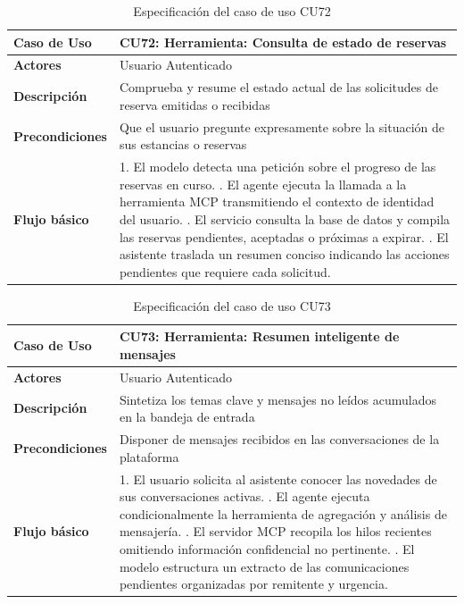 \begin{table}[H]
\centering
\begin{tabular}{|p{3.2cm}|p{11.3cm}|}
\hline
\textbf{Caso de Uso} & \textbf{CU72: Herramienta: Consulta de estado de reservas} \\ \hline
\textbf{Actores} & Usuario Autenticado \\ \hline
\textbf{Descripción} & Comprueba y resume el estado actual de las solicitudes de reserva emitidas o recibidas \\ \hline
\textbf{Precondiciones} & Que el usuario pregunte expresamente sobre la situación de sus estancias o reservas \\ \hline
\textbf{Flujo básico} & 
1. El modelo detecta una petición sobre el progreso de las reservas en curso. \newline
2. El agente ejecuta la llamada a la herramienta MCP transmitiendo el contexto de identidad del usuario. \newline
3. El servicio consulta la base de datos y compila las reservas pendientes, aceptadas o próximas a expirar. \newline
4. El asistente traslada un resumen conciso indicando las acciones pendientes que requiere cada solicitud. \\ \hline
\end{tabular}
\caption{Especificación del caso de uso CU72}
\label{tab:cu72}
\end{table}

\begin{table}[H]
\centering
\begin{tabular}{|p{3.2cm}|p{11.3cm}|}
\hline
\textbf{Caso de Uso} & \textbf{CU73: Herramienta: Resumen inteligente de mensajes} \\ \hline
\textbf{Actores} & Usuario Autenticado \\ \hline
\textbf{Descripción} & Sintetiza los temas clave y mensajes no leídos acumulados en la bandeja de entrada \\ \hline
\textbf{Precondiciones} & Disponer de mensajes recibidos en las conversaciones de la plataforma \\ \hline
\textbf{Flujo básico} & 
1. El usuario solicita al asistente conocer las novedades de sus conversaciones activas. \newline
2. El agente ejecuta condicionalmente la herramienta de agregación y análisis de mensajería. \newline
3. El servidor MCP recopila los hilos recientes omitiendo información confidencial no pertinente. \newline
4. El modelo estructura un extracto de las comunicaciones pendientes organizadas por remitente y urgencia. \\ \hline
\end{tabular}
\caption{Especificación del caso de uso CU73}
\label{tab:cu73}
\end{table}

